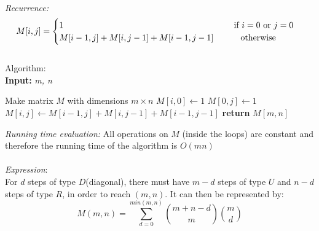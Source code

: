 \documentclass{article}
\newcommand\tab[1][1cm]{\hspace*{#1}}
\begin{document}
\\
\textit{Recurrence:}
\begin{gather*}
M[i, j] =
\begin{cases}
1 \tab\tab\tab\tab\tab\tab\tab $if $i = 0$ or $j = 0 \\
M[i-1, j] + M[i, j-1] + M[i-1, j-1] \tab $ otherwise $
\end{cases}
\end{gather*}\\
Algorithm:\\
\textbf{Input:} \textit{m, n}
\begin{algorithmic}
\State Make matrix $M$ with dimensions $m \times n$
  \State $M[i, 0] \gets 1$
\EndFor
{}
  \State $M[0, j] \gets 1$
\EndFor
{}
    \State $M[i, j] \gets M[i-1, j] + M[i, j-1] + M[i-1, j-1]$
  \EndFor
\EndFor
\State \textbf{return} $M[m, n]$\\
\end{algorithmic}
\textit{Running time evaluation:} All operations on $M$ (inside the loops) are constant and therefore the running time of the algorithm is $O(mn)$\\\\
\textit{Expression}:\\
For $d$ steps of type $D$(diagonal), there must have $m - d$ steps of type $U$ and $n - d$ steps of type $R$, in order to reach $(m, n)$. It can then be represented by:\\
$$M(m, n) = \sum_{d=0}^{min(m, n)} {m + n - d \choose m} {m \choose d} $$
\end{document}
